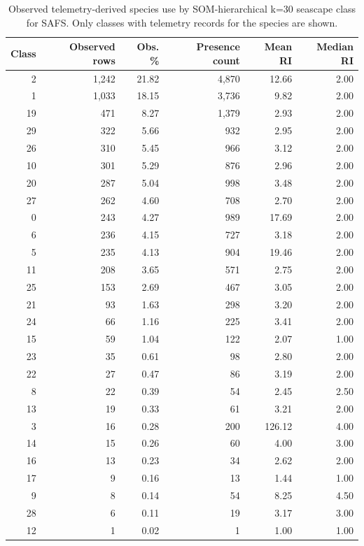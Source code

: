 \begin{table}[htbp]
\centering
\scriptsize
\caption{Observed telemetry-derived species use by SOM-hierarchical k=30 seascape class for SAFS. Only classes with telemetry records for the species are shown.}
\label{tab:appendix-observed-seascape-use-safs}
\begin{tabular}{rrrrrr}
\hline
Class & Observed rows & Obs. \% & Presence count & Mean RI & Median RI \\
\hline
2 & 1,242 & 21.82 & 4,870 & 12.66 & 2.00 \\
1 & 1,033 & 18.15 & 3,736 & 9.82 & 2.00 \\
19 & 471 & 8.27 & 1,379 & 2.93 & 2.00 \\
29 & 322 & 5.66 & 932 & 2.95 & 2.00 \\
26 & 310 & 5.45 & 966 & 3.12 & 2.00 \\
10 & 301 & 5.29 & 876 & 2.96 & 2.00 \\
20 & 287 & 5.04 & 998 & 3.48 & 2.00 \\
27 & 262 & 4.60 & 708 & 2.70 & 2.00 \\
0 & 243 & 4.27 & 989 & 17.69 & 2.00 \\
6 & 236 & 4.15 & 727 & 3.18 & 2.00 \\
5 & 235 & 4.13 & 904 & 19.46 & 2.00 \\
11 & 208 & 3.65 & 571 & 2.75 & 2.00 \\
25 & 153 & 2.69 & 467 & 3.05 & 2.00 \\
21 & 93 & 1.63 & 298 & 3.20 & 2.00 \\
24 & 66 & 1.16 & 225 & 3.41 & 2.00 \\
15 & 59 & 1.04 & 122 & 2.07 & 1.00 \\
23 & 35 & 0.61 & 98 & 2.80 & 2.00 \\
22 & 27 & 0.47 & 86 & 3.19 & 2.00 \\
8 & 22 & 0.39 & 54 & 2.45 & 2.50 \\
13 & 19 & 0.33 & 61 & 3.21 & 2.00 \\
3 & 16 & 0.28 & 200 & 126.12 & 4.00 \\
14 & 15 & 0.26 & 60 & 4.00 & 3.00 \\
16 & 13 & 0.23 & 34 & 2.62 & 2.00 \\
17 & 9 & 0.16 & 13 & 1.44 & 1.00 \\
9 & 8 & 0.14 & 54 & 8.25 & 4.50 \\
28 & 6 & 0.11 & 19 & 3.17 & 3.00 \\
12 & 1 & 0.02 & 1 & 1.00 & 1.00 \\
\hline
\end{tabular}
\end{table}

